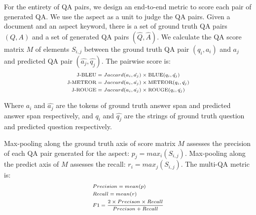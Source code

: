 For the entirety of QA pairs, we design an end-to-end metric to score each pair of generated QA.
We use the aspect as a unit to judge the QA pairs.
Given a document and an aspect keyword, there is a set of ground truth QA pairs $(Q, A)$ and a set of generated QA pairs $(\hat{Q}, \hat{A})$.
We calculate the QA score matrix $M$ of elements $S_{i,j}$ between the ground truth QA pair $(q_i, a_i)$ and $a_j$ and predicted QA pair $(\hat{a_j}, \hat{q_j})$.
The pairwise score is:
\begin{equation}
\scriptsize
\begin{aligned}
\text{J-BLEU} &= Jaccard(a_i, \hat{a_j})\times \text{BLUE}(q_i, \hat{q_j})\\
\text{J-METEOR} &=Jaccard(a_i, \hat{a_j})\times \text{METEOR}(q_i, \hat{q_j})\\
\text{J-ROUGE} &= Jaccard(a_i, \hat{a_j})\times \text{ROUGE}(q_i, \hat{q_j})\\
\end{aligned}
\end{equation}

Where $a_i$ and $\hat{a_j}$ are the tokens of ground truth answer span and predicted answer span respectively, and $q_i$ and $\hat{q_j}$ are the strings of ground truth question and predicted question respectively.

Max-pooling along the ground truth axis of score matrix $M$ assesses the precision of each QA pair generated for the aspect: $p_j=max_i(S_{i,j})$.
Max-pooling along the predict axis of $M$ assesses the recall:  $r_i=max_j(S_{i,j})$.
The multi-QA metric is:
\begin{equation}
\scriptsize
\begin{split}
&Precision=mean(p)\\
&Recall=mean(r)\\
&F1=\frac{2\times Precison\times Recall}{Precison+Recall}
\end{split}
\end{equation}


